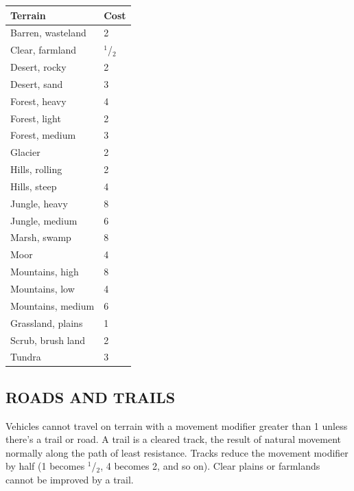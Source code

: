 \begin{multicols}{2}
\noindent
\begin{minipage}{\columnwidth}

\label{overlandcosts}
\noindent
\begin{tabular}{|p{}|p{}|}
\hline
Terrain				& Cost \\
\hline\hline
\rowcolor[gray]{.9}Barren, wasteland	& 2 \\
Clear, farmland		& $^1$/$_2$ \\
\rowcolor[gray]{.9}Desert, rocky		& 2 \\
Desert, sand		& 3 \\
\rowcolor[gray]{.9}Forest, heavy		& 4 \\
Forest, light		& 2 \\
\rowcolor[gray]{.9}Forest, medium		& 3 \\
Glacier				& 2 \\
\rowcolor[gray]{.9}Hills, rolling		& 2 \\
Hills, steep		& 4 \\
\rowcolor[gray]{.9}Jungle, heavy		& 8 \\
Jungle, medium		& 6 \\
\rowcolor[gray]{.9}Marsh, swamp		& 8 \\
Moor				& 4 \\
\rowcolor[gray]{.9}Mountains, high		& 8 \\
Mountains, low		& 4 \\
\rowcolor[gray]{.9}Mountains, medium	& 6 \\
Grassland, plains	& 1 \\
\rowcolor[gray]{.9}Scrub, brush land	& 2 \\
Tundra				& 3 \\
\hline
\end{tabular}

\end{minipage}

\subsection{ROADS AND TRAILS}

Vehicles cannot travel on terrain with a movement modifier greater than 1 unless there's a trail or road.  A trail is a cleared track, the result of natural movement normally along the path of least resistance.  Tracks reduce the movement modifier by half (1 becomes $^1$/$_2$, 4 becomes 2, and so on).  Clear plains or farmlands cannot be improved by a trail. 


\end{multicols}
